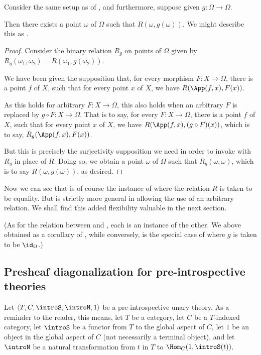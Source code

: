 \label{RelatedlyFixedPointTheorem}
Consider the same setup as of , and furthermore, suppose given $g : \Omega \to \Omega$.

Then there exists a point $\omega$ of $\Omega$ such that $R(\omega, g(\omega))$. We might describe this as .
\begin{proof}
Consider the binary relation $R_g$ on points of $\Omega$ given by $R_g(\omega_1, \omega_2) = R(\omega_1, g(\omega_2))$.

We have been given the supposition that, for every morphism $F : X \to \Omega$, there is a point $f$ of $X$, such that for every point $x$ of $X$, we have $R(\App(f, x), F(x))$.

As this holds for arbitrary $F : X \to \Omega$, this also holds when an arbitrary $F$ is replaced by $g \circ F : X \to \Omega$. That is to say, for every $F : X \to \Omega$, there is a point $f$ of $X$, such that for every point $x$ of $X$, we have $R(\App(f, x), (g \circ F)(x))$, which is to say, $R_g(\App(f, x), F(x))$.

But this is precisely the surjectivity supposition we need in order to invoke  with $R_g$ in place of $R$. Doing so, we obtain a point $\omega$ of $\Omega$ such that $R_g(\omega, \omega)$, which is to say $R(\omega, g(\omega))$, as desired.
\end{proof}

Now we can see that  is of course the instance of  where the relation $R$ is taken to be equality. But  is strictly more general in allowing the use of an arbitrary relation. We shall find this added flexibility valuable in the next section.

(As for the relation between  and , each is an instance of the other. We above obtained  as a corollary of , while conversely,  is the special case of  where $g$ is taken to be $\id_{\Omega}$.)

\subsection{Presheaf diagonalization for pre-introspective theories}
\label{RevampedPreintroLawvere}
Let $\langle T, C, \introS, \introN, 1 \rangle$ be a pre-introspective unary theory. As a reminder to the reader, this means, let $T$ be a category, let $C$ be a $T$-indexed category, let $\introS$ be a functor from $T$ to the global aspect of $C$, let $1$ be an object in the global aspect of $C$ (not necessarily a terminal object), and let $\introN$ be a natural transformation from $t$ in $T$ to $\Hom_C(1, \introS(t))$.

